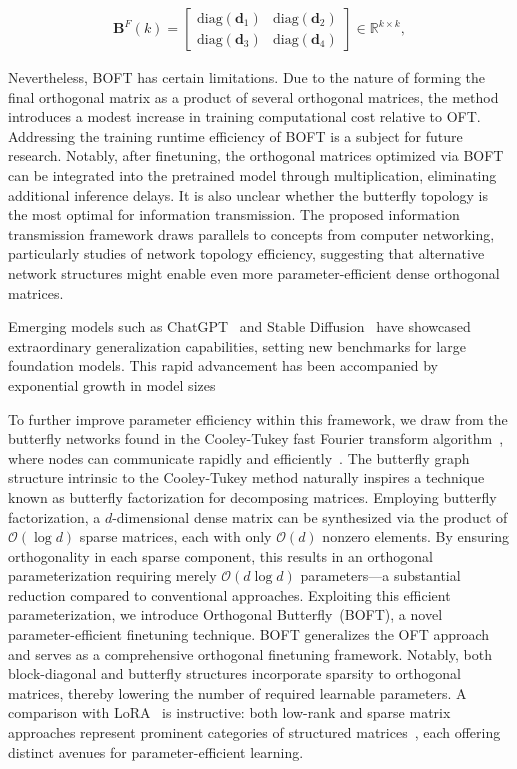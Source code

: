 \begin{equation}\label{eq:but_factor}
\begin{aligned}
    \bm{B}^F(k)=\begin{bmatrix}
    \text{diag}(\bm{d}_1) & \text{diag}(\bm{d}_2) \\
    \text{diag}(\bm{d}_3) & \text{diag}(\bm{d}_4)
    \end{bmatrix}\in\mathbb{R}^{k\times k},
\end{aligned}
\end{equation}

Nevertheless, BOFT has certain limitations. Due to the nature of forming the final orthogonal matrix as a product of several orthogonal matrices, the method introduces a modest increase in training computational cost relative to OFT. Addressing the training runtime efficiency of BOFT is a subject for future research. Notably, after finetuning, the orthogonal matrices optimized via BOFT can be integrated into the pretrained model through multiplication, eliminating additional inference delays. It is also unclear whether the butterfly topology is the most optimal for information transmission. The proposed information transmission framework draws parallels to concepts from computer networking, particularly studies of network topology efficiency, suggesting that alternative network structures might enable even more parameter-efficient dense orthogonal matrices.

Emerging models such as ChatGPT~\cite{brown2020language,chen2021evaluating} and Stable Diffusion~\cite{rombach2022high} have showcased extraordinary generalization capabilities, setting new benchmarks for large foundation models. This rapid advancement has been accompanied by exponential growth in model sizes

To further improve parameter efficiency within this framework, we draw from the butterfly networks found in the Cooley-Tukey fast Fourier transform algorithm~\cite{cooley1965algorithm}, where nodes can communicate rapidly and efficiently~\cite{klasing1994broadcasting}. The butterfly graph structure intrinsic to the Cooley-Tukey method naturally inspires a technique known as butterfly factorization for decomposing matrices. Employing butterfly factorization, a $d$-dimensional dense matrix can be synthesized via the product of $\mathcal{O}(\log d)$ sparse matrices, each with only $\mathcal{O}(d)$ nonzero elements. By ensuring orthogonality in each sparse component, this results in an orthogonal parameterization requiring merely $\mathcal{O}(d \log d)$ parameters—a substantial reduction compared to conventional approaches. Exploiting this efficient parameterization, we introduce Orthogonal Butterfly~(BOFT), a novel parameter-efficient finetuning technique. BOFT generalizes the OFT approach and serves as a comprehensive orthogonal finetuning framework. Notably, both block-diagonal and butterfly structures incorporate sparsity to orthogonal matrices, thereby lowering the number of required learnable parameters. A comparison with LoRA~\cite{hulora2022} is instructive: both low-rank and sparse matrix approaches represent prominent categories of structured matrices~\cite{candes2011robust}, each offering distinct avenues for parameter-efficient learning.

